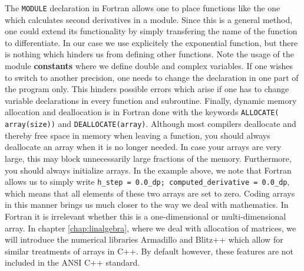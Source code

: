 The \verb?MODULE? declaration in Fortran allows one to place functions
like the one which calculates second derivatives in a module. Since this is a general method,
one could extend its functionality by simply transfering 
the name of the function to differentiate. In our case we use explicitely the exponential
function, but there is nothing which hinders us from defining other functions. 
Note the usage of the module {\bf constants} where we define double and complex variables.
If one wishes to switch to another precision, one needs to change the declaration
in one part of the program only. This hinders possible errors which arise if one has to change
variable declarations in every function and subroutine.   
Finally, dynamic memory allocation and deallocation is in Fortran 
done with the keywords \verb?ALLOCATE( array(size))? and \verb?DEALLOCATE(array)?.
Although most compilers deallocate and thereby free space in memory when leaving a
function, you should always deallocate an array when it is no longer needed. In case your arrays
are very large, this may block unnecessarily large fractions of the memory. 
Furthermore, you should always initialize arrays. In the example above, we note that Fortran allows
us to simply write \verb?h_step = 0.0_dp; computed_derivative = 0.0_dp?, which means that all
elements of these two arrays are set to zero.  Coding arrays in this manner brings us much
closer to the way we deal with mathematics. 
In Fortran  it is irrelevant whether this is a one-dimensional or multi-dimensional array.
In chapter \ref{chap:linalgebra}, where we deal with
allocation of matrices, we will introduce the  numerical libraries Armadillo and 
Blitz++ which allow for similar
treatments of arrays in C++. By default however, these features are not included in 
the ANSI C++ standard. 

